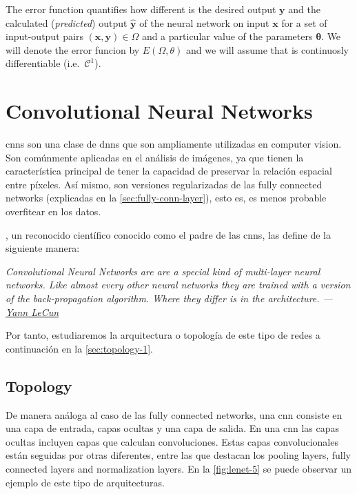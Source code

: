 The error function quantifies how different is the desired output
\(\mathbf{y}\) and the calculated (\emph{predicted}) output
\(\mathbf{\hat{y}}\) of the neural network on input \(\mathbf{x}\) for a set of
input-output pairs \((\mathbf{x}, \mathbf{y}) \in \Omega\) and a particular
value of the parameters \(\bm{\theta}\). We will denote the error funcion by
\(E(\Omega, \theta)\) and we will assume that is continuosly differentiable
(i.e.\ \(\mathcal{C}^1\)).


\section{Convolutional Neural Networks}
\label{sec:conv-neur-netw}

\glspl{cnn} son una clase de \glspl{dnn} que son ampliamente utilizadas en
computer vision. Son comúnmente aplicadas en el análisis de imágenes, ya que
tienen la característica principal de tener la capacidad de preservar la
relación espacial entre píxeles. Así mismo, son versiones regularizadas de las
fully connected networks (explicadas en la \vref{sec:fully-conn-layer}), esto
es, es menos probable overfitear en los datos.

, un reconocido científico
conocido como el padre de las \glspl{cnn}, las define de la siguiente manera:
\begin{quoteBox}
  \itshape
  Convolutional Neural Networks are are a special kind of multi-layer neural
  networks. Like almost every other neural networks they are trained with a
  version of the back-propagation algorithm. Where they differ is in the
  architecture.
  \tcblower
  \hfill \upshape
  ---\href{http://yann.lecun.com/index.html}{Yann LeCun}
\end{quoteBox}

Por tanto, estudiaremos la arquitectura o topología de este tipo de redes a
continuación en la \vref{sec:topology-1}.

\subsection{Topology} \label{sec:topology-1}

De manera análoga al caso de las fully connected networks, una \gls{cnn}
consiste en una capa de entrada, capas ocultas y una capa de salida. En una
\gls{cnn} las capas ocultas incluyen capas que calculan convoluciones. Estas
capas convolucionales están seguidas por otras diferentes, entre las que
destacan los pooling layers, fully connected layers and normalization
layers. En la \vref{fig:lenet-5} se puede observar un ejemplo de este
tipo de arquitecturas.

